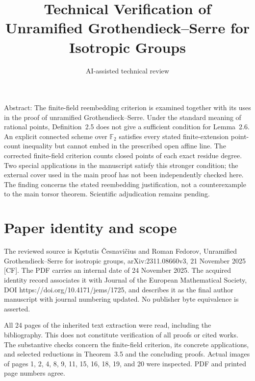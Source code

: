 \documentclass[10pt]{article}
\title{Technical Verification of
Unramified Grothendieck–Serre for Isotropic Groups}
\author{AI-assisted technical review}
\date{}
\begin{document}
\maketitle
Abstract: The finite-field reembedding criterion is examined together with its uses in the proof of unramified Grothendieck–Serre. Under the standard meaning of rational points, Definition 2.5 does not give a sufficient condition for Lemma 2.6. An explicit connected scheme over \(\mathbb F_2\) satisfies every stated finite-extension point-count inequality but cannot embed in the prescribed open affine line. The corrected finite-field criterion counts closed points of each exact residue degree. Two special applications in the manuscript satisfy this stronger condition; the external cover used in the main proof has not been independently checked here. The finding concerns the stated reembedding justification, not a counterexample to the main torsor theorem. Scientific adjudication remains pending.\par
\section*{Paper identity and scope}
The reviewed source is Kęstutis Česnavičius and Roman Fedorov, Unramified Grothendieck–Serre for isotropic groups, arXiv:2311.08660v3, 21 November 2025 [CF]. The PDF carries an internal date of 24 November 2025. The acquired identity record associates it with Journal of the European Mathematical Society, DOI https://doi.org/10.4171/jems/1725, and describes it as the final author manuscript with journal numbering updated. No publisher byte equivalence is asserted.\par
All 24 pages of the inherited text extraction were read, including the bibliography. This does not constitute verification of all proofs or cited works. The substantive checks concern the finite-field criterion, its concrete applications, and selected reductions in Theorem 3.5 and the concluding proofs. Actual images of pages 1, 2, 4, 8, 9, 11, 15, 16, 18, 19, and 20 were inspected. PDF and printed page numbers agree.\par
\end{document}
